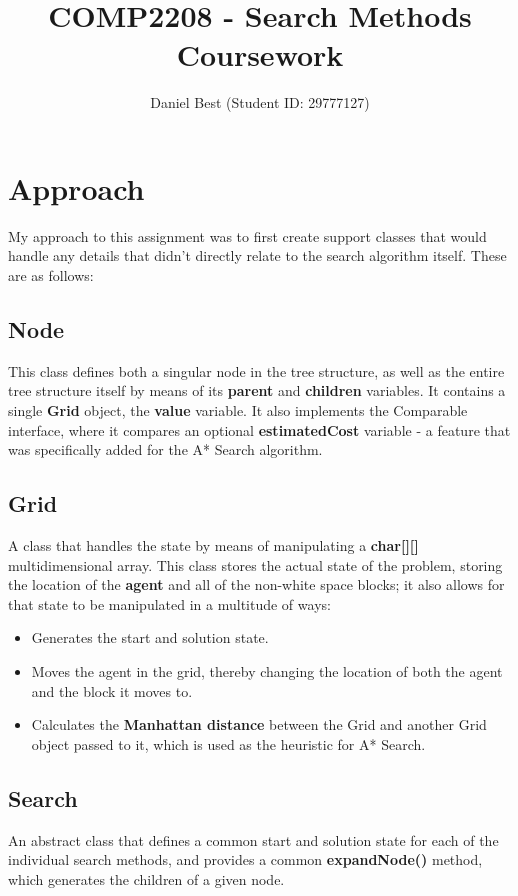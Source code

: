 \documentclass{article}
\title{COMP2208 - Search Methods Coursework}
\author{Daniel Best (Student ID: 29777127)}
\begin{document}
	\maketitle
	
	\newpage
	
	\section{Approach}
	My approach to this assignment was to first create support classes that would handle any details that didn't directly relate to the search algorithm itself. These are as follows:
	
	\subsection{Node}
	This class defines both a singular node in the tree structure, as well as the entire tree structure itself by means of its \textbf{parent} and \textbf{children} variables. It contains a single \textbf{Grid} object, the \textbf{value} variable. It also implements the Comparable interface, where it compares an optional \textbf{estimatedCost} variable - a feature that was specifically added for the A* Search algorithm.

	\subsection{Grid}
	A class that handles the state by means of manipulating a \textbf{char[][]} multidimensional array. This class stores the actual state of the problem, storing the location of the \textbf{agent} and all of the non-white space blocks; it also allows for that state to be manipulated in a multitude of ways:
	
	\begin{itemize}
		\item Generates the start and solution state.
		\item Moves the agent in the grid, thereby changing the location of both the agent and the block it moves to.
		\item Calculates the \textbf{Manhattan distance} between the Grid and another Grid object passed to it, which is used as the heuristic for A* Search.
	\end{itemize}
	
	\subsection{Search}
	An abstract class that defines a common start and solution state for each of the individual search methods, and provides a common \textbf{expandNode()} method, which generates the children of a given node.
	
\end{document}
